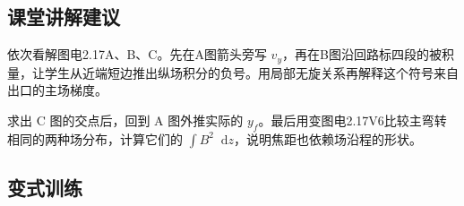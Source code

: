 \documentclass[UTF8,fontset=fandol,a4paper,11pt]{ctexart}
\newcommand{\dd}{\mathop{}\!\mathrm{d}}
\begin{document}


\subsection*{课堂讲解建议}

依次看解图电2.17A、B、C。先在A图箭头旁写 $v_y$，再在B图沿回路标四段的被积量，让学生从近端短边推出纵场积分的负号。用局部无旋关系再解释这个符号来自出口的主场梯度。

求出 C 图的交点后，回到 A 图外推实际的 $y_f$。最后用变图电2.17V6比较主弯转相同的两种场分布，计算它们的 $\int B^2\dd z$，说明焦距也依赖场沿程的形状。


\subsection*{变式训练}
\end{document}
